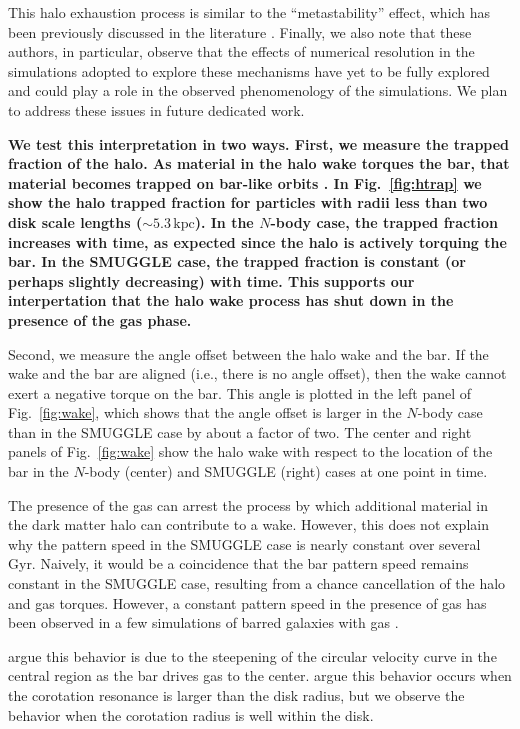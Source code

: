 \documentclass[twocolumn,linenumbers,trackchanges]{aastex631}
\newcommand{\Nbody}{$N$-body}
\newcommand{\SMUGGLE}{SMUGGLE}
\begin{document}
This halo exhaustion process is similar to the ``metastability'' effect, which
has been previously discussed in the literature \citep{2003MNRAS.345..406V,
2006ApJ...639..868S}. Finally, we also note that these authors, in particular,
observe that the effects of numerical resolution in the simulations adopted to
explore these mechanisms have yet to be fully explored and could play a role in
the observed phenomenology of the simulations. We plan to address these issues
in future dedicated work.

{\bf We test this interpretation in two ways. First, we measure the trapped
fraction of the halo. As material in the halo wake torques the bar, that
material becomes trapped on bar-like orbits \citep[the ``shadow
bar'';][]{2016MNRAS.463.1952P}. In Fig.~\ref{fig:htrap} we show the halo trapped
fraction for particles with radii less than two disk scale lengths
($\sim5.3\,\textrm{kpc}$). In the \Nbody{} case, the trapped fraction increases
with time, as expected since the halo is actively torquing the bar. In the
\SMUGGLE{} case, the trapped fraction is constant (or perhaps slightly
decreasing) with time. This supports our interpertation that the halo wake
process has shut down in the presence of the gas phase.}

Second, we measure the angle offset between the halo wake and the bar. If the
wake and the bar are aligned (i.e., there is no angle offset), then the wake
cannot exert a negative torque on the bar. This angle is plotted in the left
panel of Fig.~\ref{fig:wake}, which shows that the angle offset is larger in the
\Nbody{} case than in the \SMUGGLE{} case by about a factor of two. The center
and right panels of Fig.~\ref{fig:wake} show the halo wake with respect to the
location of the bar in the \Nbody{} (center) and \SMUGGLE{} (right) cases at one
point in time.

The presence of the gas can arrest the process by which additional material in
the dark matter halo can contribute to a wake. However, this does not explain
why the pattern speed in the \SMUGGLE{} case is nearly constant over several
Gyr. Naively, it would be a coincidence that the bar pattern speed remains
constant in the \SMUGGLE{} case, resulting from a chance cancellation of the
halo and gas torques. However, a constant pattern speed in the presence of gas
has been observed in a few simulations of barred galaxies with gas
\citep{1993AA...268...65F, 2007ApJ...666..189B, 2009ApJ...707..218V,
2010ApJ...719.1470V, 2014MNRAS.438L..81A}.

\citet{1993AA...268...65F} argue this behavior is due to the steepening of the
circular velocity curve in the central region as the bar drives gas to the
center. \citet{2009ApJ...707..218V} argue this behavior occurs when the
corotation resonance is larger than the disk radius, but we observe the behavior
when the corotation radius is well within the disk.
\end{document}
